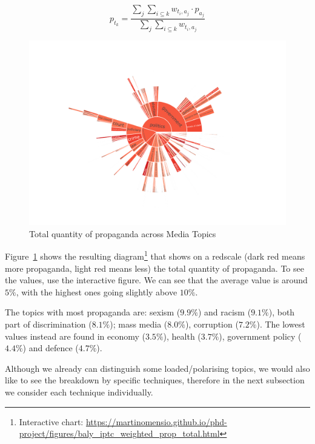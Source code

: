 $$ p_{t_{k}} = \frac{ \sum_{j} \sum_{i\subseteq k} w_{t_{i},a_{j}} \cdot p_{a_{j}} }{ \sum_{j} \sum_{i\subseteq k} w_{t_{i},a_{j}} } $$

\begin{figure}[!htbp]
    \centering
    \includegraphics[trim={2.2cm 2cm 2.2cm 2cm},clip,width=\linewidth]{figures/baly_iptc_weighted_prop_total.pdf}
    \caption{Total quantity of propaganda across Media Topics}
    \label{fig:baly_iptc_weighted_prop_total}
\end{figure}

Figure~\ref{fig:baly_iptc_weighted_prop_total} shows the resulting diagram\footnote{Interactive chart: \url{https://martinomensio.github.io/phd-project/figures/baly_iptc_weighted_prop_total.html}} that shows on a redscale (dark red means more propaganda, light red means less) the total quantity of propaganda. To see the values, use the interactive figure.
We can see that the average value is around $5\%$, with the highest ones going slightly above $10\%$.

The topics with most propaganda are: sexism ($9.9\%$) and racism ($9.1\%$), both part of discrimination ($8.1\%$); mass media ($8.0\%$), corruption ($7.2\%$). The lowest values instead are found in economy ($3.5\%$), health ($3.7\%$), government policy ($4.4\%$) and defence ($4.7\%$).

Although we already can distinguish some loaded/polarising topics, we would also like to see the breakdown by specific techniques, therefore in the next subsection we consider each technique individually.

